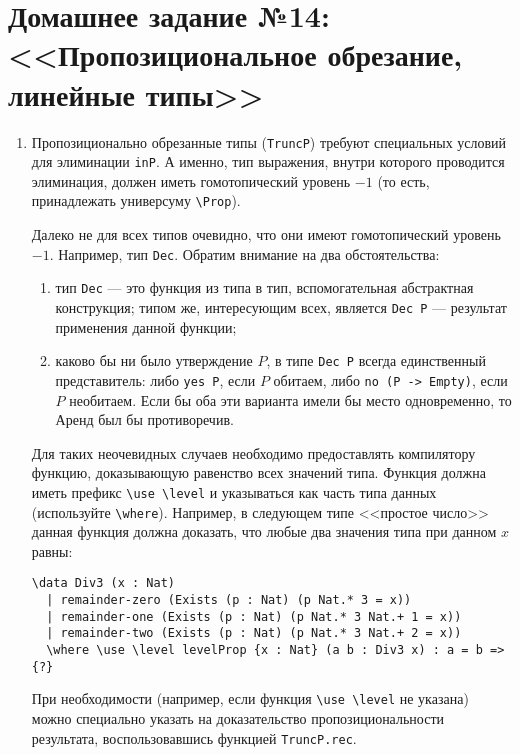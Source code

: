 \documentclass[10pt,a4paper,oneside]{article}
\begin{document}
\section*{Домашнее задание №14: <<Пропозициональное обрезание, линейные типы>>}
\begin{enumerate}
\item Пропозиционально обрезанные типы (\verb!TruncP!) требуют специальных условий для элиминации \verb!inP!.
А именно, тип выражения, внутри которого проводится элиминация, должен иметь гомотопический 
уровень $-1$ (то есть, принадлежать универсуму \verb!\Prop!).

Далеко не для всех типов очевидно, что они имеют гомотопический уровень $-1$. 
Например, тип \verb!Dec!. Обратим внимание на два обстоятельства:
\begin{enumerate}
\item тип \verb!Dec! --- это функция из типа в тип, вспомогательная абстрактная конструкция; 
типом же, интересующим всех, является \verb!Dec P! --- результат применения данной функции;
\item каково бы ни было утверждение $P$, в типе \verb!Dec P!
всегда единственный представитель: либо \verb!yes P!, если $P$ обитаем, 
либо \verb!no (P -> Empty)!, если $P$ необитаем. 
Если бы оба эти варианта имели бы место одновременно, то Аренд был бы противоречив.
\end{enumerate}

Для таких неочевидных случаев необходимо предоставлять компилятору функцию, доказывающую равенство всех значений типа. 
Функция должна иметь префикс \verb!\use \level! и указываться как часть типа данных (используйте \verb!\where!). 
Например, в следующем типе <<простое число>> данная функция должна доказать, что любые два значения типа при данном $x$ равны:

\begin{verbatim}
\data Div3 (x : Nat)
  | remainder-zero (Exists (p : Nat) (p Nat.* 3 = x))
  | remainder-one (Exists (p : Nat) (p Nat.* 3 Nat.+ 1 = x))
  | remainder-two (Exists (p : Nat) (p Nat.* 3 Nat.+ 2 = x))
  \where \use \level levelProp {x : Nat} (a b : Div3 x) : a = b => {?}
\end{verbatim}

При необходимости (например, если функция \verb!\use \level! не указана) можно специально 
указать на доказательство пропозициональности результата, воспользовавшись 
функцией \verb!TruncP.rec!.


\end{enumerate}
\end{document}
